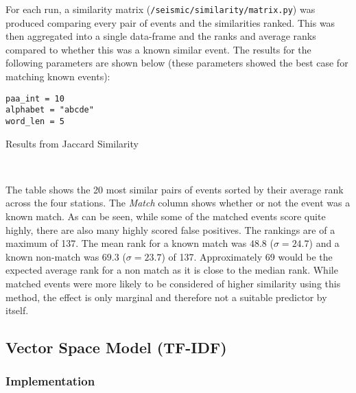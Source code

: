 \documentclass[../report.tex]{subfiles}
\begin{document}
	For each run, a similarity matrix (\texttt{/seismic/similarity/matrix.py}) was produced comparing every pair of events and the similarities ranked.  This was then aggregated into a single data-frame and the ranks and average ranks compared to whether this was a known similar event.  The results for the following parameters are shown below (these parameters showed the best case for matching known events):
	
\begin{verbatim}
paa_int = 10
alphabet = "abcde"
word_len = 5
\end{verbatim}

\begin{table}[H]
	\caption{Results from Jaccard Similarity}
	\\
\end{table}

	The table shows the 20 most similar pairs of events sorted by their average rank across the four stations.  The \textit{Match} column shows whether or not the event was a known match.  As can be seen, while some of the matched events score quite highly, there are also many highly scored false positives.  The rankings are of a maximum of 137.  The mean rank for a known match was $48.8$ ($\sigma = 24.7$) and a known non-match was $69.3$ ($\sigma = 23.7$) of 137.  Approximately 69 would be the expected average rank for a non match as it is close to the median rank.  While matched events were more likely to be considered of higher similarity using this method, the effect is only marginal and therefore not a suitable predictor by itself.

\subsection{Vector Space Model (TF-IDF)} \label{sec:vsm-impl}
\subsubsection{Implementation}
\end{document}
